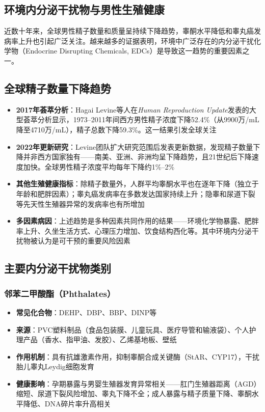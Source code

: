 \begin{enumerate}
\section{环境内分泌干扰物与男性生殖健康}

近数十年来，全球男性精子数量和质量呈持续下降趋势，睾酮水平降低和睾丸癌发病率上升也引起广泛关注。越来越多的证据表明，环境中广泛存在的内分泌干扰化学物（Endocrine Disrupting Chemicals, EDCs）是导致这一趋势的重要因素之一。

\subsection{全球精子数量下降趋势}

\begin{itemize}[leftmargin=2cm]
	\item \textbf{2017年荟萃分析}：Hagai Levine等人在\textit{Human Reproduction Update}发表的大型荟萃分析显示，1973--2011年间西方男性精子浓度下降52.4\%（从9900万/mL降至4710万/mL），精子总数下降59.3\%。这一结果引发全球关注
	\item \textbf{2022年更新研究}：Levine团队扩大研究范围后发表更新数据，发现精子数量下降并非西方国家独有——南美、亚洲、非洲均呈下降趋势，且21世纪后下降速度加快。全球男性精子浓度平均每年下降约1\%--2\%
	\item \textbf{其他生殖健康指标}：除精子数量外，人群平均睾酮水平也在逐年下降（独立于年龄和肥胖因素）；睾丸癌发病率在多数发达国家持续上升；隐睾和尿道下裂等先天性生殖器异常的发病率也有所增加
	\item \textbf{多因素病因}：上述趋势是多种因素共同作用的结果——环境化学物暴露、肥胖率上升、久坐生活方式、心理压力增加、饮食结构西化等。其中环境内分泌干扰物被认为是可干预的重要风险因素
\end{itemize}

\subsection{主要内分泌干扰物类别}

\subsubsection{邻苯二甲酸酯（Phthalates）}

\begin{itemize}[leftmargin=2cm]
	\item \textbf{常见化合物}：DEHP、DBP、BBP、DINP等
	\item \textbf{来源}：PVC塑料制品（食品包装膜、儿童玩具、医疗导管和输液袋）、个人护理产品（香水、指甲油、发胶）、乙烯基地板、壁纸
	\item \textbf{作用机制}：具有抗雄激素作用，抑制睾酮合成关键酶（StAR、CYP17），干扰胎儿睾丸Leydig细胞发育
	\item \textbf{健康影响}：孕期暴露与男婴生殖器发育异常相关——肛门生殖器距离（AGD）缩短、尿道下裂风险增加、睾丸下降不全；成人暴露与精子质量下降、睾酮水平降低、DNA碎片率升高相关
\end{itemize}


\end{enumerate}
